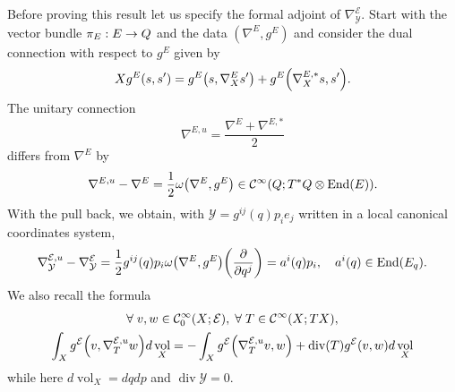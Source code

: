 \documentclass[AHL,Unicode,longabstracts]{cedram}
\newcommand{\clC}{\mathcal{C}}
\newcommand{\clY}{\mathcal{Y}}
\newcommand{\clE}{\mathcal{E}}
\DeclareMathOperator{\voll}{vol}
\DeclareMathOperator{\End}{End}
\DeclareMathOperator{\divv}{div}
\let\oldforall\forall
\renewcommand*{\forall}{\mathrel{\oldforall}}
\let\originalleft\left
\let\originalright\right
\renewcommand{\left}{\mathopen{}\mathclose\bgroup\originalleft}
\renewcommand{\right}{\aftergroup\egroup\originalright}
\renewcommand*{\to}{\mathchoice{\longrightarrow}{\rightarrow}{\rightarrow}{\rightarrow}}
\begin{document}
Before proving this result let us specify the formal adjoint of $\nabla_{\clY}^{\clE}$. Start with the vector bundle $\pi_{E}:E\to Q$ and the data $(\nabla^{E},g^{E})$ and consider the dual connection with respect to $g^{E}$ given by
\[
Xg^{E}(s,s')=g^{E}\left(s, \nabla^{E}_{X}s'\right)+g^{E}\left(\nabla_{X}^{E,*}s, s'\right).
\]
The unitary connection
\[
\nabla^{E,u}=\frac{\nabla^{E}+\nabla^{E,*}}{2}
\]
differs from $\nabla^{E}$ by
\[
\nabla^{E,u}-\nabla^{E}=\frac{1}{2}\omega\left(\nabla^{E},g^{E}\right)\in \clC^{\infty}(Q;T^{*}Q\otimes\End(E)).
\]
With the pull back, we obtain, with $\clY=g^{ij}(q)p_{i}e_{j}$ written in a local canonical coordinates system,
\[
\nabla^{\clE,u}_{\clY}-\nabla^{\clE}_{\clY}=\frac{1}{2}
g^{ij}(q)p_{i}\omega\left(\nabla^{E},g^{E}\right)\left(\frac{\partial}{\partial q^{j}}\right)=a^{i}(q)p_{i},\quad a^{i}(q)\in \End(E_{q}).
\]
We also recall the formula
\begin{multline*}
\forall v,w\in \clC^{\infty}_{0}(X;\clE),\;\forall T\in \clC^{\infty}(X;TX),\\
\int_{X}g^{\clE}\left(v,\nabla^{\clE,u}_{T}w\right) d\voll_X=-\int_{X}g^{\clE}\left(\nabla_{T}^{\clE,u}v,w\right) +\divv(T)g^{\clE}(v,w) d\voll_{X}
\end{multline*}
while here $d\voll_{X}=dqdp$ and $\divv \clY=0$.
\end{document}
